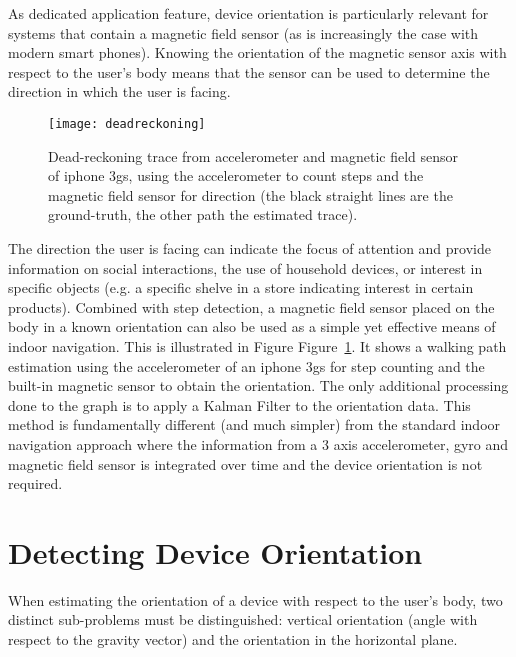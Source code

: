 As dedicated application feature, device orientation is particularly
relevant for systems that contain a magnetic field sensor (as is
increasingly the case with modern smart phones). Knowing the
orientation of the magnetic sensor axis with respect to the user's
body means that the sensor can be used to determine the direction in
which the user is facing. 
\begin{figure}[t]
  \begin{center}
  \texttt{[image: deadreckoning]}
	\end{center}
\caption{Dead-reckoning trace from accelerometer and magnetic field sensor of iphone 3gs, using the accelerometer to count steps
and the magnetic field sensor for direction (the black straight lines are the ground-truth, the other path the estimated trace).}
\label{fig:footsteps} \end{figure}
The direction the user is facing can indicate the focus of attention and 
provide information on social interactions, the use of household
devices, or interest in specific objects (e.g. a specific shelve in a
store indicating interest in certain products). Combined with step
detection, a magnetic field sensor placed on the body in a known
orientation can also be used as a simple yet effective means of indoor
navigation. This is illustrated in Figure Figure~\ref{fig:footsteps}.
It shows a walking path estimation using the accelerometer of an
iphone 3gs for step counting and the built-in magnetic sensor to
obtain the orientation. The only additional processing done to the
graph is to apply a Kalman Filter to the orientation data. This method 
is fundamentally different (and much simpler) from the
standard indoor navigation approach where the information from a 3
axis accelerometer, gyro and magnetic field sensor is integrated over
time and the device orientation is not required.

\section{Detecting Device Orientation}
\label{sec:orientationdetection}
When estimating the orientation of a device with respect to the user's
body, two distinct sub-problems must be distinguished: vertical
orientation (angle with respect to the gravity vector) and the
orientation in the horizontal plane.

